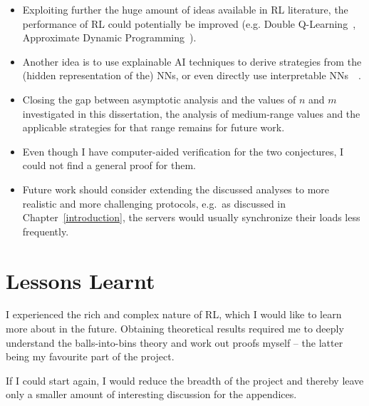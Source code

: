 \begin{itemize}
    \item Exploiting further the huge amount of ideas available in RL literature, the performance of RL could potentially be improved (e.g. Double Q-Learning~\cite{hasselt2010doubleqlearning}, Approximate Dynamic Programming~\cite{bellman1959approximatedp}).
    \item Another idea is to use explainable AI techniques to derive strategies from the (hidden representation of the) NNs, or even directly use interpretable NNs~\cite{vacareanu2022explainableAI1}~\cite{tang2022explainableAI2}.
    \item Closing the gap between asymptotic analysis and the values of $n$ and $m$ investigated in this dissertation, the analysis of medium-range values and the applicable strategies for that range remains for future work.
    \item Even though I have computer-aided verification for the two conjectures, I could not find a general proof for them.
    \item Future work should consider extending the discussed analyses to more realistic and more challenging protocols, e.g.\ as discussed in Chapter~\ref{introduction}, the servers would usually synchronize their loads less frequently.
\end{itemize}

 

\iffalse %
It is definitely possible to try improving RL, and hopefully get closer to the optimal strategies. For example, double learning~\cite{hasselt2010doubleqlearning}, which argues that vanilla (deep) Q-Learning overestimates the action values by under the hood using $\mathbb{E}[\max_a(Q(s,a)]$ instead of $\max_a(\mathbb{E}[Q(s,a)])$. Another idea is approximate dynamic programming \cite{bellman1959approximatedp} which can potentially make better use of the fully known environment for the agent.
\fi




\section{Lessons Learnt}

I experienced the rich and complex nature of RL, which I would like to learn more about in the future. Obtaining theoretical results required me to deeply understand the balls-into-bins theory and work out proofs myself -- the latter being my favourite part of the project.

If I could start again, I would reduce the breadth of the project and thereby leave only a smaller amount of interesting discussion for the appendices.

